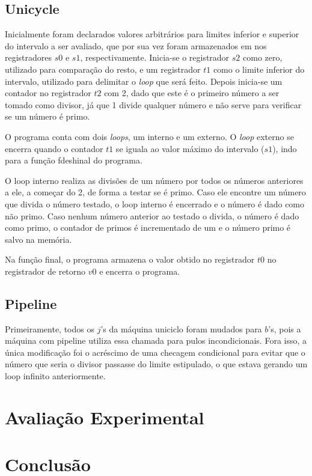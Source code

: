 \subsection{Unicycle}
Inicialmente foram declarados valores arbitrários para limites inferior e superior do intervalo a ser avaliado, que por sua vez foram armazenados em nos registradores $s0$ e $s1$, respectivamente. Inicia-se o registrador $s2$ como zero, utilizado para comparação do resto, e um registrador $t1$ como o limite inferior do intervalo, utilizado para delimitar o {\it loop} que será feito. Depois inicia-se um contador no registrador $t2$ com 2, dado que este é o primeiro número a ser tomado como divisor, já que 1 divide qualquer número e não serve para verificar se um número é primo.\par
O programa conta com dois {\it loops}, um interno e um externo. O {\it loop} externo se encerra quando o contador $t1$ se iguala ao valor máximo do intervalo ($s1$), indo para a função fdeshinal do programa.\par
O loop interno realiza as divisões de um número por todos os números anteriores a ele, a começar do 2, de forma a testar se é primo. Caso ele encontre um número que divida o número testado, o loop interno é encerrado e o número é dado como não primo. Caso nenhum número anterior ao testado o divida, o número é dado como primo, o contador de primos é incrementado de um e o número primo é salvo na memória.\par
Na função final, o programa armazena o valor obtido no registrador $t0$ no registrador de retorno $v0$ e encerra o programa.

\subsection{Pipeline}
Primeiramente, todos os $j$'s da máquina uniciclo foram mudados para $b$'s, pois a máquina com pipeline utiliza essa chamada para pulos incondicionais. Fora isso, a única modificação foi o acréscimo de uma checagem condicional para evitar que o número que seria o divisor passasse do limite estipulado, o que estava gerando um loop infinito anteriormente.

\section{Avaliação Experimental}


\section{Conclusão}
